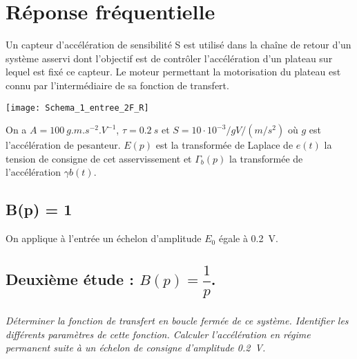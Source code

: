 
\section*{Réponse fréquentielle}

Un capteur d'accélération de sensibilité S est utilisé dans la chaîne de retour d'un système asservi dont l'objectif est de contrôler l'accélération d'un plateau sur lequel est fixé ce capteur. Le moteur permettant la motorisation du plateau est connu par l'intermédiaire de sa fonction de transfert. 


\begin{center}
\texttt{[image: Schema\_1\_entree\_2F\_R]}
\end{center}

On a  $A = \SI{100}{g.m.s^{-2}.V^{-1}}$, $\tau=\SI{0,2}{s}$ et $S = 10\cdot 10^{-3}/g V/(m/s^2)$ où $g$ est l'accélération de pesanteur. $E(p)$ est la transformée de Laplace de $e(t)$ la tension de consigne de cet asservissement et $\Gamma_b(p)$ la transformée de l'accélération $\gamma b(t)$.

\subsection*{B(p) = 1}
On applique à l'entrée un échelon d'amplitude $E_0$ égale à \SI{0,2}{V}.


%
%




\subsection*{Deuxième étude : $B(p) = \dfrac{1}{p}$.}

\subparagraph{}
\textit{Déterminer la fonction de transfert en boucle fermée de ce système. Identifier les différents paramètres de cette fonction. Calculer l'accélération en régime permanent suite à un échelon de consigne d'amplitude \SI{0,2}{V}.}
%



\ifprof
\else
\fi
